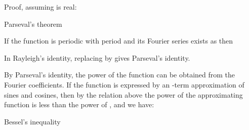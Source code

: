 \begin{EMproof}

Proof, assuming  is real:

\end{EMproof}

\EMhold


\begin{EMtheorem}{Parseval's theorem}

If the function  is periodic with period  and its Fourier series exists as
then

\end{EMtheorem}

\begin{EMproof}

In Rayleigh's identity, replacing  by  gives Parseval's identity.

\end{EMproof}

By Parseval's identity, the power of the function  can be obtained from the Fourier coefficients. If the function is expressed by an -term approximation of sines and cosines, then by the relation above the power of the approximating function is less than the power of , and we have:

\begin{EMimportant}{Bessel's inequality}


\end{EMimportant}

